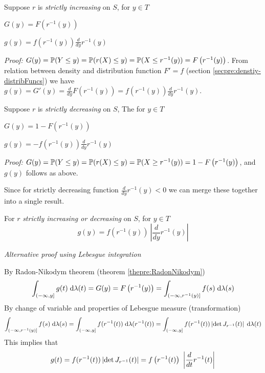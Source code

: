 Suppose $r$ is \emph{strictly increasing} on $S$, for $y \in T$
\begin{compactitem}
\item $G(y) = F\left( r^{-1}(y)\right)$
\item $g(y) = f\left( r^{-1}(y)\right) \frac{d}{dy}r^{-1}(y)$
\end{compactitem}

\emph{Proof:} $G(y) = \mathbb{P}(Y \leq y) = \mathbb{P}(r(X) \leq y) = \mathbb{P}(X \leq r^{-1}(y)) = F\left( r^{-1}(y)\right)$.
From relation between density and distribution function $F' = f$ (section \ref{secpre:denstiy-distribFuncs}) we have $g(y) = G'(y) = \frac{d}{dy} F\left( r^{-1}(y)\right) = f\left( r^{-1}(y)\right) \frac{d}{dy}r^{-1}(y)$.

Suppose $r$ is \emph{strictly decreasing} on $S$, The for $y \in T$
\begin{compactitem}
\item $G(y) = 1 - F\left( r^{-1}(y)\right)$
\item $g(y) = - f\left( r^{-1}(y)\right) \frac{d}{dy}r^{-1}(y)$
\end{compactitem}
\emph{Proof:} $G(y) = \mathbb{P}(Y \leq y) = \mathbb{P}(r(X) \leq y) = \mathbb{P}(X \geq r^{-1}(y)) = 1 - F\left( r^{-1}(y)\right)$, and $g(y)$ follows as above.

Since for strictly decreasing function $\frac{d}{dy}r^{-1}(y) < 0$ we can merge these together into a single result. 

\begin{theorem}
For $r$ \emph{strictly increasing or decreasing} on $S$, for $y \in T$
\begin{equation}\label{eqpre:changeOfVar}
g(y) = f\left( r^{-1}(y)\right) \ \left\lvert \frac{d}{dy}r^{-1}(y) \right\rvert
\end{equation}
\end{theorem}

\emph{Alternative proof using Lebesgue integration}

By Radon-Nikodym theorem (theorem \ref{thepre:RadonNikodym})
\begin{equation}
\int_{(-\infty, y]} g(t) \; \text{d} \lambda(t) = G(y) = F\left( r^{-1}(y)\right) = \int_{(-\infty, r^{-1}(y)]} f(s) \; \text{d} \lambda(s)
\end{equation}
By change of variable and properties of Lebesgue measure (transformation)
\begin{equation}
\int_{(-\infty, r^{-1}(y)]} f(s) \; \text{d} \lambda(s) = \int_{(-\infty, y]} f(r^{-1}(t)) \; \text{d} \lambda(r^{-1}(t)) = \int_{(-\infty, y]} f(r^{-1}(t)) \, \lvert  \det J_{r^{-1}}(t) \rvert \, \; \text{d} \lambda(t)
\end{equation}
This implies that 
\begin{equation}
g(t) = f(r^{-1}(t)) \, \lvert  \det J_{r^{-1}}(t) \rvert = f\left( r^{-1}(t)\right) \ \left\lvert \frac{d}{dt}r^{-1}(t) \right\rvert
\end{equation}


